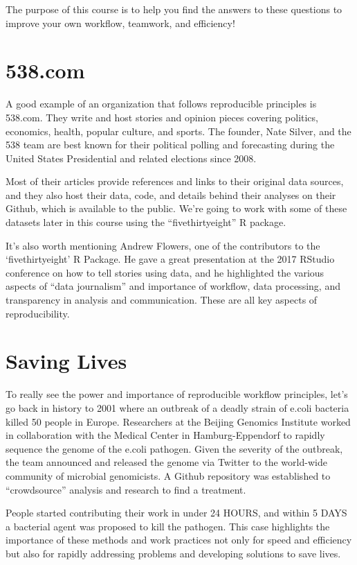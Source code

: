 \documentclass[]{book}
\theoremstyle{definition}
\theoremstyle{definition}
\theoremstyle{definition}
\theoremstyle{remark}
\begin{document}
The purpose of this course is to help you find the answers to these
questions to improve your own workflow, teamwork, and efficiency!

\section{538.com}\label{com}

A good example of an organization that follows reproducible principles
is 538.com. They write and host stories and opinion pieces covering
politics, economics, health, popular culture, and sports. The founder,
Nate Silver, and the 538 team are best known for their political polling
and forecasting during the United States Presidential and related
elections since 2008.

Most of their articles provide references and links to their original
data sources, and they also host their data, code, and details behind
their analyses on their Github, which is available to the public. We're
going to work with some of these datasets later in this course using the
``fivethirtyeight'' R package.

It's also worth mentioning Andrew Flowers, one of the contributors to
the `fivethirtyeight' R Package. He gave a great presentation at the
2017 RStudio conference on how to tell stories using data, and he
highlighted the various aspects of ``data journalism'' and importance of
workflow, data processing, and transparency in analysis and
communication. These are all key aspects of reproducibility.

\section{Saving Lives}\label{saving-lives}

To really see the power and importance of reproducible workflow
principles, let's go back in history to 2001 where an outbreak of a
deadly strain of e.coli bacteria killed 50 people in Europe. Researchers
at the Beijing Genomics Institute worked in collaboration with the
Medical Center in Hamburg-Eppendorf to rapidly sequence the genome of
the e.coli pathogen. Given the severity of the outbreak, the team
announced and released the genome via Twitter to the world-wide
community of microbial genomicists. A Github repository was established
to ``crowdsource'' analysis and research to find a treatment.

People started contributing their work in under 24 HOURS, and within 5
DAYS a bacterial agent was proposed to kill the pathogen. This case
highlights the importance of these methods and work practices not only
for speed and efficiency but also for rapidly addressing problems and
developing solutions to save lives.
\end{document}
